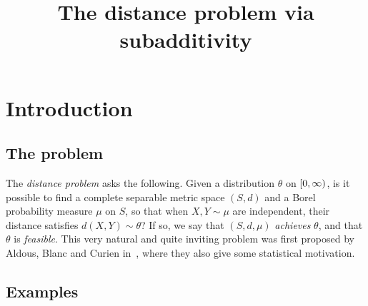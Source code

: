 \documentclass[AHL,Unicode]{cedram}
\title[The distance problem via subadditivity]{The distance problem via subadditivity}
\author[\initial{R.} \lastname{Gross}]{\firstname{Renan} \lastname{Gross}}
\newcommand*\nonnegative{\left[0,\infty\right)}
\let\originalleft\left
\let\originalright\right
\renewcommand{\left}{\mathopen{}\mathclose\bgroup\originalleft}
\renewcommand{\right}{\aftergroup\egroup\originalright}
\begin{document}
\maketitle

\section{Introduction}
\subsection{The problem}

The \emph{distance problem} asks the following. Given a distribution $\theta$ on $\nonnegative$, is it possible to find a complete separable metric space $(S,d)$ and a Borel probability measure $\mu$ on $S$, so that when $X,Y\sim\mu$ are independent, their distance satisfies $d(X,Y)\sim\theta$? If so, we say that $(S,d,\mu)$
\emph{achieves} $\theta$, and that $\theta$ is \emph{feasible}. This very natural and quite inviting problem was first proposed by Aldous, Blanc and Curien in~\cite{aldous_blanc_curien_distance_problem_2024}, where they also give some statistical motivation.

\subsection{Examples}
\end{document}
